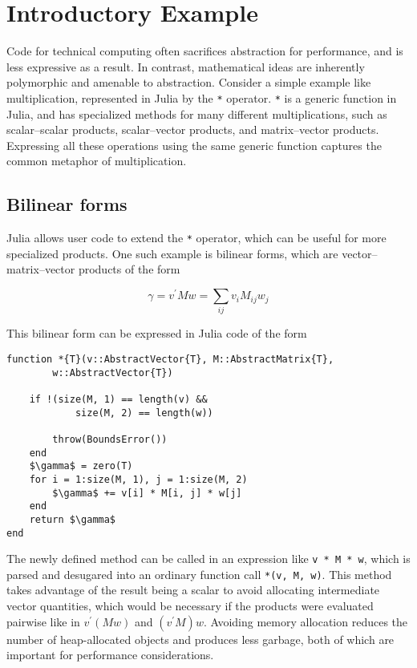 \section{Introductory Example}

Code for technical computing often sacrifices abstraction for performance,
and is less expressive as a result. In contrast, mathematical ideas are
inherently polymorphic and amenable to abstraction. Consider a simple example
like multiplication, represented in Julia by the \lstinline|*| operator.
\lstinline|*| is a generic function in Julia, and has specialized methods for
many different multiplications, such as scalar--scalar products, scalar--vector
products, and matrix--vector products. Expressing all these operations using
the same generic function captures the common metaphor of multiplication.

\subsection{Bilinear forms}

Julia allows user code to extend the \lstinline|*| operator, which can be
useful for more specialized products. One such example is bilinear forms, which
are vector--matrix--vector products of the form

\begin{equation}
\gamma = v^\prime M w = \sum_{ij} v_i M_{ij} w_j
\end{equation}

This bilinear form can be expressed in Julia code of the form
%
\begin{lstlisting}
function *{T}(v::AbstractVector{T}, M::AbstractMatrix{T},
        w::AbstractVector{T})

    if !(size(M, 1) == length(v) &&
            size(M, 2) == length(w))

        throw(BoundsError())
    end
    $\gamma$ = zero(T)
    for i = 1:size(M, 1), j = 1:size(M, 2)
        $\gamma$ += v[i] * M[i, j] * w[j]
    end
    return $\gamma$
end
\end{lstlisting}
%
The newly defined method can be called in an expression like
\lstinline|v * M * w|, which is parsed and desugared into an ordinary function
call \lstinline|*(v, M, w)|. This method takes advantage of the result being a
scalar to avoid allocating intermediate vector quantities, which would be
necessary if the products were evaluated pairwise like in $v^\prime(Mw)$ and
$(v^\prime M) w$. Avoiding memory allocation reduces the number of
heap-allocated objects and produces less garbage, both of which are important
for performance considerations.

